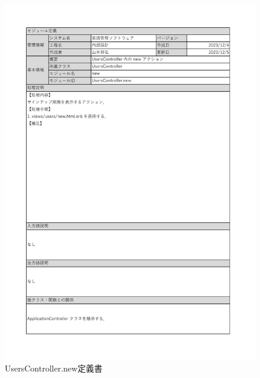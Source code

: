 \begin{figure}
    \centering
    \includegraphics[scale=0.7]{img/Users/xlsx/UsersController_new.pdf}
    \caption{UsersController.new定義書}
\end{figure}

